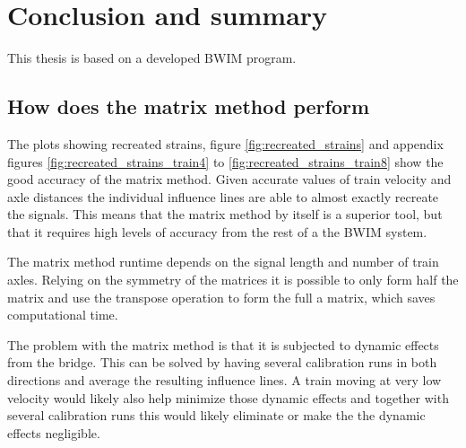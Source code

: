 \chapter{Conclusion and summary}
This thesis is based on a developed BWIM program.



\section{How does the matrix method perform}
The plots showing recreated strains, figure \ref{fig:recreated_strains} and appendix figures \ref{fig:recreated_strains_train4} to \ref{fig:recreated_strains_train8}  show the good accuracy of the matrix method. Given accurate values of train velocity and axle distances the individual influence lines are able to almost exactly recreate the signals. This means that the matrix method by itself is a superior tool, but that it requires high levels of accuracy from the rest of a the BWIM system.

The matrix method runtime depends on the signal length and number of train axles. Relying on the symmetry of the matrices it is possible to only form half the matrix and use the transpose operation to form the full a matrix, which saves computational time.

The problem with the matrix method is that it is subjected to dynamic effects from the bridge. This can be solved by having several calibration runs in both directions and average the resulting influence lines. A train moving at very low velocity would likely also help minimize those dynamic effects and together with several calibration runs this would likely eliminate or make the the dynamic effects negligible.
